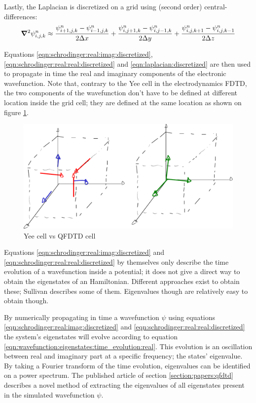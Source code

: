 Lastly, the Laplacian is discretized on a grid using (second order)
central-differences:
\begin{align}
\bm{\nabla}^2 \psi_{i,j,k}^{n} \approx
      \frac{ \psi_{i+1,j,k}^{n} - \psi_{i-1,j,k}^{n} }{2 \Delta x}
    + \frac{ \psi_{i,j+1,k}^{n} - \psi_{i,j-1,k}^{n} }{2 \Delta y}
    + \frac{ \psi_{i,j,k+1}^{n} - \psi_{i,j,k-1}^{n} }{2 \Delta z}
\label{eqn:laplacian:discretized}
\end{align}

Equations \eqref{eqn:schrodinger:real:imag:discretized},
\eqref{eqn:schrodinger:real:real:discretized} and
\eqref{eqn:laplacian:discretized} are then used to propagate in time the real
and imaginary components of the electronic wavefunction. Note that, contrary
to the Yee cell in the electrodynamics FDTD, the two components of the
wavefunction don't have to be defined at different location inside the grid
cell; they are defined at the same location as shown on figure
\ref{fig:qfdtd:cell}.

\begin{figure}
 \centering
 \includegraphics[width=0.8\columnwidth]{figures/mockups/yee_vs_qfdtd}
 \caption{Yee cell vs QFDTD cell}
 \label{fig:qfdtd:cell}
\end{figure}

Equations \eqref{eqn:schrodinger:real:imag:discretized} and
\eqref{eqn:schrodinger:real:real:discretized} by themselves only describe the
time evolution of a wavefunction inside a potential; it does not give a direct
way to obtain the eigenstates of an Hamiltonian. Different approaches exist to
obtain these; Sullivan describes some of them. Eigenvalues though are
relatively easy to obtain though.

By numerically propagating in time a wavefunction $\psi$ using equations
\eqref{eqn:schrodinger:real:imag:discretized} and
\eqref{eqn:schrodinger:real:real:discretized} the system's eigenstates will
evolve according to equation
\eqref{eqn:wavefunction:eigenstates:time_evolution:real}. This evolution is an
oscillation between real and imaginary part at a specific frequency; the states'
eigenvalue. By taking a Fourier transform of the time evolution, eigenvalues
can be identified on a power spectrum. The published article of section
\ref{section:papers:qfdtd} describes a novel method of extracting the
eigenvalues of all eigenstates present in the simulated wavefunction $\psi$.



